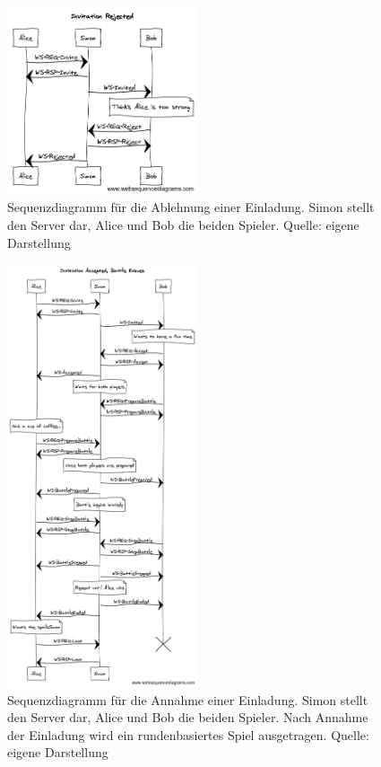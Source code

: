\documentclass[ngerman,11pt]{report}
\begin{document}
\begin{figure}
\caption{Sequenzdiagramm für die Ablehnung einer Einladung. Simon stellt den Server dar, Alice und Bob die beiden Spieler. Quelle: eigene Darstellung}
\centering
\includegraphics[width=0.5\textwidth]{InvitationRejected}
\end{figure}

\begin{figure}
\caption{Sequenzdiagramm für die Annahme einer Einladung. Simon stellt den Server dar, Alice und Bob die beiden Spieler. Nach Annahme der Einladung wird ein rundenbasiertes Spiel ausgetragen. Quelle: eigene Darstellung}
\centering
\includegraphics[width=0.5\textwidth]{InvitationAccepted}
\end{figure}
\end{document}
